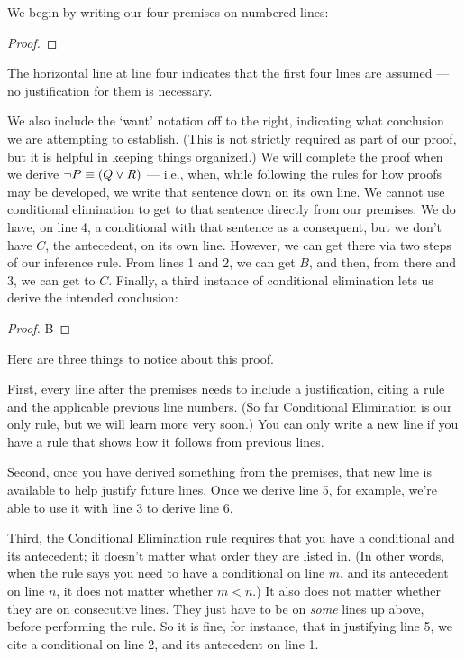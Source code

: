 We begin by writing our four premises on numbered lines:

\begin{proof}
	 
\end{proof}

The horizontal line at line four indicates that the first four lines are assumed --- no justification for them is necessary.

We also include the `want' notation off to the right, indicating what conclusion we are attempting to establish. (This is not strictly required as part of our proof, but it is helpful in keeping things organized.) We will complete the proof when we derive $\neg P \equiv (Q \vee R)$ --- i.e., when, while following the rules for how proofs may be developed, we write that sentence down on its own line. We cannot use conditional elimination to get to that sentence directly from our premises. We do have, on line 4, a conditional with that sentence as a consequent, but we don't have $C$, the antecedent, on its own line. However, we can get there via two steps of our inference rule. From lines 1 and 2, we can get $B$, and then, from there and 3, we can get to $C$. Finally, a third instance of conditional elimination lets us derive the intended conclusion:

\begin{proof}
	 
	 {B} 
	 
	 
\end{proof}

Here are three things to notice about this proof.

First, every line after the premises needs to include a justification, citing a rule and the applicable previous line numbers. (So far Conditional Elimination is our only rule, but we will learn more very soon.) You can only write a new line if you have a rule that shows how it follows from previous lines.

Second, once you have derived something from the premises, that new line is available to help justify future lines. Once we derive line 5, for example, we're able to use it with line 3 to derive line 6.

Third, the Conditional Elimination rule requires that you have a conditional and its antecedent; it doesn't matter what order they are listed in. (In other words, when the rule says you need to have a conditional on line $m$, and its antecedent on line $n$, it does not matter whether $m<n$.) It also does not matter whether they are on consecutive lines. They just have to be on \emph{some} lines up above, before performing the rule.  So it is fine, for instance, that in justifying line 5, we cite a conditional on line 2, and its antecedent on line 1.

